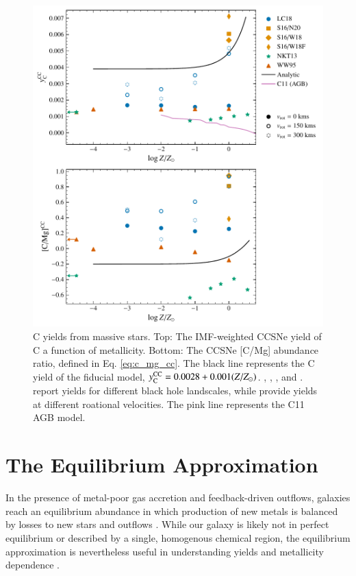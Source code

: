 \documentclass[12pt,oneside]{report}
\newcommand{\Ycc}{\ensuremath{y_{\rm C}^{\rm CC}}}
\begin{document}
\begin{figure}[htp]
    \centering
    \includegraphics{y_c_cc.pdf}
    \caption[CCSNe C yields]{
        C yields from massive stars.
        Top: The IMF-weighted CCSNe yield of C a function of metallicity.
        Bottom: The CCSNe [C/Mg] abundance ratio, defined in Eq. \ref{eq:c_mg_cc}. The black line represents the C yield of the fiducial model,
    $\Ycc = 0.0028 + 0.001 (Z/Z_{\odot})$. 
    \citet[red triangles]{WW95}, \citet[orange squares and diamonds]{sukhbold+16}, 
    \citet[green stars]{NKT13}, and \citet[blue circles]{LC18}. \citet{sukhbold+16} report yields for different black hole landscales, while \citet{LC18} provide yields at different roational velocities.
The pink line represents the C11 AGB model.
}
    \label{fig:y_cc}
\end{figure}

\chapter{The Equilibrium Approximation}\label{sec:equilibrium}

In the presence of metal-poor gas accretion and feedback-driven outflows, galaxies reach an equilibrium abundance in which production of new metals is balanced by losses to new stars and outflows \citep{larson72, dalcanton07, FD08, PS11, lilly13}.
While our galaxy is likely not in perfect equilibrium or described by a single, homogenous chemical region, the equilibrium approximation is nevertheless useful in understanding yields and metallicity dependence \citep[e.g.][]{james_dwarf,james+22,WAF17}. 
\end{document}
